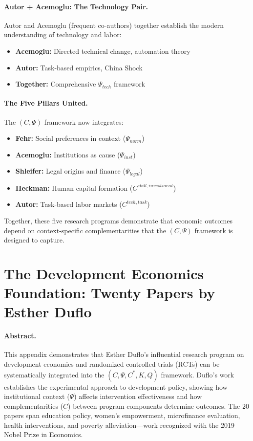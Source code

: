 \documentclass[12pt,a4paper]{article}
\begin{document}
\paragraph{Autor + Acemoglu: The Technology Pair.}
Autor and Acemoglu (frequent co-authors) together establish the modern
understanding of technology and labor:
\begin{itemize}
  \item \textbf{Acemoglu:} Directed technical change, automation theory
  \item \textbf{Autor:} Task-based empirics, China Shock
  \item \textbf{Together:} Comprehensive $\Psi_{tech}$ framework
\end{itemize}

\paragraph{The Five Pillars United.}
The $(C, \Psi)$ framework now integrates:
\begin{itemize}
  \item \textbf{Fehr:} Social preferences in context ($\Psi_{norm}$)
  \item \textbf{Acemoglu:} Institutions as cause ($\Psi_{inst}$)
  \item \textbf{Shleifer:} Legal origins and finance ($\Psi_{legal}$)
  \item \textbf{Heckman:} Human capital formation ($C^{skill,investment}$)
  \item \textbf{Autor:} Task-based labor markets ($C^{tech,task}$)
\end{itemize}

Together, these five research programs demonstrate that economic outcomes
depend on context-specific complementarities that the $(C, \Psi)$ framework
is designed to capture.

\section{The Development Economics Foundation: Twenty Papers by Esther Duflo}
\label{app:duflo}

\paragraph{Abstract.}
This appendix demonstrates that Esther Duflo's influential research program on
development economics and randomized controlled trials (RCTs) can be systematically 
integrated into the $(C, \Psi, C^*, K, Q)$ framework. Duflo's work establishes
the experimental approach to development policy, showing how institutional context 
($\Psi$) affects intervention effectiveness and how complementarities ($C$) between
program components determine outcomes. The 20 papers span education policy,
women's empowerment, microfinance evaluation, health interventions, and poverty
alleviation---work recognized with the 2019 Nobel Prize in Economics.
\end{document}
